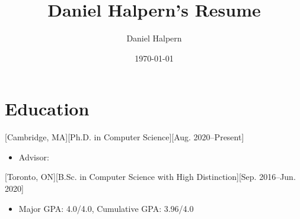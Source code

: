 \documentclass{article}
\title{Daniel Halpern's Resume}
\author{Daniel Halpern}
\date{\today}
\newcommand{\link}[2]{\iftoggle{uselinks}{\href{#1}{#2}}{#2}\xspace}
\begin{document}

    \makecvtitle %

    \section{Education}

    [Cambridge, MA][Ph.D. in Computer Science][Aug. 2020--Present]
    \begin{itemize}
        \item Advisor: \link{http://procaccia.info}{Ariel D. Procaccia}
    \end{itemize}

    [Toronto, ON][B.Sc. in Computer Science with High Distinction][Sep. 2016--Jun. 2020]
    \begin{itemize}
        \item Major GPA: 4.0/4.0, Cumulative GPA: 3.96/4.0
    \end{itemize}
\end{document}
